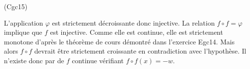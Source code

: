 \begin{tiny}(Cgc15)\end{tiny} L'application $\varphi$ est strictement décroissante donc injective. La relation $f\circ f = \varphi$ implique que $f$ est injective. Comme elle est continue, elle est strictement monotone d'après le théorème de cours démontré dans l'exercice Egc14. Mais alors $f\circ f$ devrait être strictement croissante en contradiction avec l'hypothèse. Il n'existe donc par de $f$ continue vérifiant $f\circ f (x) = -w$.